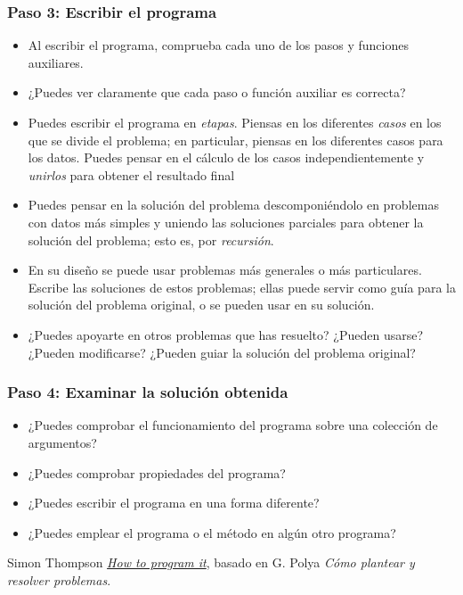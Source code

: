 \subsubsection*{Paso 3: Escribir el programa}
\begin{itemize}
\item Al escribir el programa, comprueba cada uno de los pasos y funciones
  auxiliares. 
\item ¿Puedes ver claramente que cada paso o función auxiliar es correcta?
\item Puedes escribir el programa en \emph{etapas}. Piensas en los diferentes
  \emph{casos} en los que se divide el problema; en particular, piensas en los
  diferentes casos para los datos. Puedes pensar en el cálculo de los casos
  independientemente y \emph{unirlos} para obtener el resultado final
\item Puedes pensar en la solución del problema descomponiéndolo en problemas
  con datos más simples y uniendo las soluciones parciales para obtener la
  solución del problema; esto es, por \emph{recursión}.
\item En su diseño se puede usar problemas más generales o más
  particulares. Escribe las soluciones de estos problemas; ellas puede servir
  como guía para la solución del problema original, o se pueden usar en su
  solución. 
\item ¿Puedes apoyarte en otros problemas que has resuelto? ¿Pueden usarse?
  ¿Pueden modificarse? ¿Pueden guiar la solución del problema original?
\end{itemize}

\subsubsection*{Paso 4: Examinar la solución obtenida}
\begin{itemize}
\item ¿Puedes comprobar el funcionamiento del programa sobre una colección de
  argumentos? 
\item ¿Puedes comprobar propiedades del programa?
\item ¿Puedes escribir el programa en una forma diferente?
\item ¿Puedes emplear el programa o el método en algún otro programa? 
\end{itemize}

\noindent
Simon Thompson 
\href{http://www.cs.kent.ac.uk/people/staff/sjt/Haskell_craft/HowToProgIt.html}
     {\emph{How to program it}}, 
basado en G. Polya \emph{Cómo plantear y resolver problemas}.
